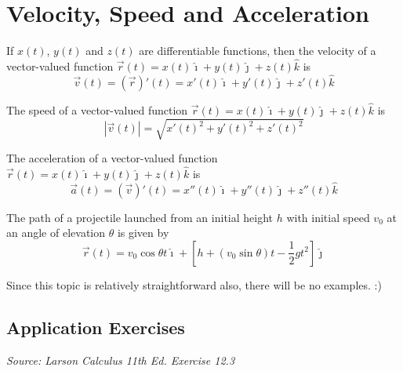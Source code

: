 \chapter{Velocity, Speed and Acceleration}

If $x(t)$, $y(t)$ and $z(t)$ are differentiable functions, then the velocity of
a vector-valued function $\vec{r}(t) = x(t)\hat{\imath} + y(t)\hat{\jmath} +
    z(t)\hat{k}$ is \[\vec{v}(t) = (\vec{r})'(t) = x'(t)\hat{\imath} + y'(t)\hat{\jmath} + z'(t)\hat{k}\]

The speed of a vector-valued function $\vec{r}(t) = x(t)\hat{\imath} +
    y(t)\hat{\jmath} + z(t)\hat{k}$ is \[|\vec{v}(t)| = \sqrt{x'(t)^2 + y'(t)^2 + z'(t)^2}\]

The acceleration of a vector-valued function $\vec{r}(t) = x(t)\hat{\imath} +
    y(t)\hat{\jmath} + z(t)\hat{k}$ is \[\vec{a}(t) = (\vec{v})'(t) = x''(t)\hat{\imath} + y''(t)\hat{\jmath} + z''(t)\hat{k}\]

The path of a projectile launched from an initial height $h$ with initial speed
$v_0$ at an angle of elevation $\theta$ is given by \[\vec{r}(t) = v_0\cos\theta t\hat{\imath} + \left[h + (v_0\sin\theta) t - \frac{1}{2}gt^2\right]\hat{\jmath}\]

Since this topic is relatively straightforward also, there will be no examples.
:)

\newpage

\section*{Application Exercises}
\textit{Source: Larson Calculus 11th Ed. Exercise 12.3}


